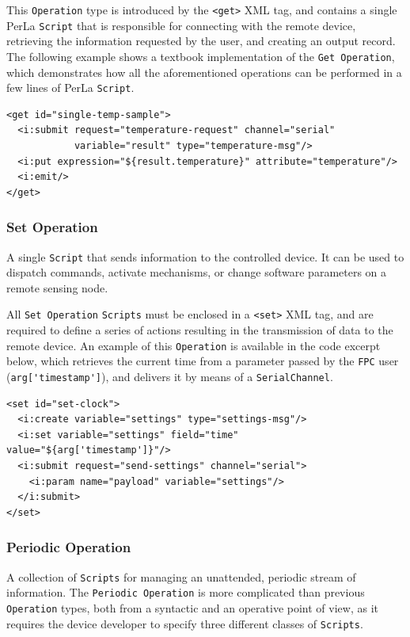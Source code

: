 This \texttt{Operation} type is introduced by the \lstinline!<get>! XML tag,
and contains a single PerLa \texttt{Script} that is responsible for connecting
with the remote device, retrieving the information requested by the user, and
creating an output record. The following example shows a textbook
implementation of the \texttt{Get Operation}, which demonstrates how all the
aforementioned operations can be performed in a few lines of PerLa
\texttt{Script}.

\lstset{language=XML}
\begin{lstlisting}
<get id="single-temp-sample">
  <i:submit request="temperature-request" channel="serial"
            variable="result" type="temperature-msg"/>
  <i:put expression="${result.temperature}" attribute="temperature"/>
  <i:emit/>
</get>
\end{lstlisting}

\subsubsection{Set Operation}

A single \texttt{Script} that sends information to the controlled device. It
can be used to dispatch commands, activate mechanisms, or change software
parameters on a remote sensing node.

All \texttt{Set Operation} \texttt{Scripts} must be enclosed in a
\lstinline!<set>! XML tag, and are required to define a series of actions
resulting in the transmission of data to the remote device. An example of this
\texttt{Operation} is available in the code excerpt below, which retrieves the
current time from a parameter passed by the \texttt{FPC} user
(\lstinline!arg['timestamp']!), and delivers it by means of a
\texttt{SerialChannel}.

\lstset{language=XML}
\begin{lstlisting}
<set id="set-clock">
  <i:create variable="settings" type="settings-msg"/>
  <i:set variable="settings" field="time" value="${arg['timestamp']}"/>
  <i:submit request="send-settings" channel="serial">
    <i:param name="payload" variable="settings"/>
  </i:submit>
</set>
\end{lstlisting}

\subsubsection{Periodic Operation}

A collection of \texttt{Scripts} for managing an unattended, periodic stream of
information. The \texttt{Periodic Operation} is more complicated than previous
\texttt{Operation} types, both from a syntactic and an operative point of view,
as it requires the device developer to specify three different classes of
\texttt{Scripts}.

